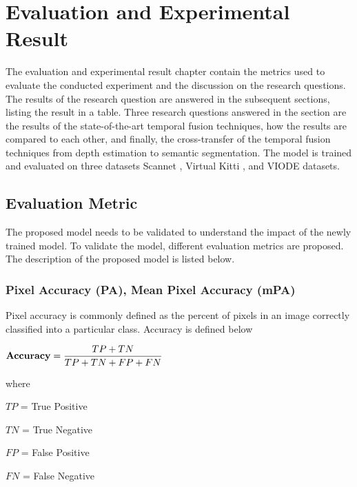 
\newcommand\scalemath[2]{\scalebox{#1}{\mbox{\ensuremath{\displaystyle #2}}}}



    \chapter{Evaluation and Experimental Result}
	\label{chap:evaluationandresult}
    The evaluation and experimental result chapter contain the metrics used to evaluate the conducted experiment and the discussion on the research questions. The results of the research question are answered in the subsequent sections, listing the result in a table. Three research questions answered in the section are the results of the state-of-the-art temporal fusion techniques, how the results are compared to each other, and finally, the cross-transfer of the temporal fusion techniques from depth estimation to semantic segmentation. The model is trained and evaluated on three datasets Scannet \cite{79_dai2017scannet}, Virtual Kitti \cite{80_cabon2020vkitti2}, and VIODE \cite{81_minodaRAL2021} datasets. 
    
    \section{Evaluation Metric}
    
    The proposed model needs to be validated to understand the impact of the newly trained model. To validate the model, different evaluation metrics are proposed. The description of the proposed model is listed below.
    
    \subsection{Pixel Accuracy (PA), Mean Pixel Accuracy (mPA)}
    
    Pixel accuracy is commonly defined as the percent of pixels in an image correctly classified into a particular class. Accuracy is defined below
    
    
    $
    {\bf Accuracy } = \scalemath{1}{\frac{TP+TN}{TP+TN+FP+FN}}
    $
    
    where
     
    $TP$ = True Positive 
    
    $TN$ = True Negative
    
    $FP$ = False Positive
    
    $FN$ = False Negative
    
